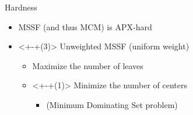 \begin{frame}{Hardness}
\begin{itemize}
	\item<+> MSSF (and thus MCM) is APX-hard
	\item<+-+(3)> Unweighted MSSF (uniform weight)
	\begin{itemize}
	  \item<+> Maximize the number of leaves 
	  \item<+-+(1)> Minimize the number of centers 
		\begin{itemize}
		  \item<+> (Minimum Dominating Set problem)
		\end{itemize}
	\end{itemize}
\end{itemize}

\vfill

\centering


\end{frame}